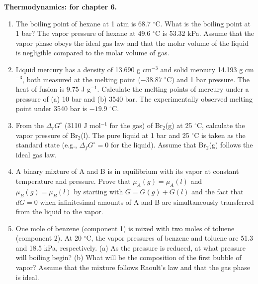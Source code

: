 \noindent
\textbf{Thermodynamics:
 for chapter 6.}\\

\begin{enumerate}

\item The boiling point of hexane at 1 atm is 68.7 $^\circ$C. What is the boiling point at 1 bar? The vapor pressure of hexane at 49.6 $^\circ$C is 53.32 kPa. Assume that the vapor phase obeys the ideal gas law and that the molar volume of the liquid is negligible compared to the molar volume of gas.


\item Liquid mercury has a density of 13.690 g cm$^{-3}$ and solid mercury 14.193 g cm$^{-3}$, both measured at the melting point ($-38.87$ $^\circ$C) and 1 bar pressure. The heat of fusion is 9.75 J g$^{-1}$. Calculate the melting points of mercury under a pressure of (a) 10 bar and (b) 3540 bar. The experimentally observed melting point under 3540 bar is $-19.9$ $^\circ$C.


\item From the $\Delta_rG^\circ$ (3110 J mol$^{-1}$ for the gas) of Br$_2$(g) at 25 $^\circ$C, calculate the vapor pressure of Br$_2$(l). The pure liquid at 1 bar and 25 $^\circ$C is taken as the standard state (e.g., $\Delta_fG^\circ = 0$ for the liquid). Assume that Br$_2$(g) follows the ideal gas law.


\item A binary mixture of A and B is in equilibrium with its vapor at constant temperature and pressure. Prove that $\mu_A(g) = \mu_{A}(l)$ and $\mu_B(g) = \mu_B(l)$ by starting with $G = G(g) + G(l)$ and the fact that $dG = 0$ when infinitesimal amounts of A and B are simultaneously transferred from the liquid to the vapor.


\item One mole of benzene (component 1) is mixed with two moles of toluene (component 2). At 20 $^\circ$C, the vapor pressures of benzene and toluene are 51.3 and 18.5 kPa, respectively. (a) As the pressure is reduced, at what pressure will boiling begin? (b) What will be the composition of the first bubble of vapor? Assume that the mixture follows Raoult's law and that the gas phase is ideal.


\end{enumerate}
